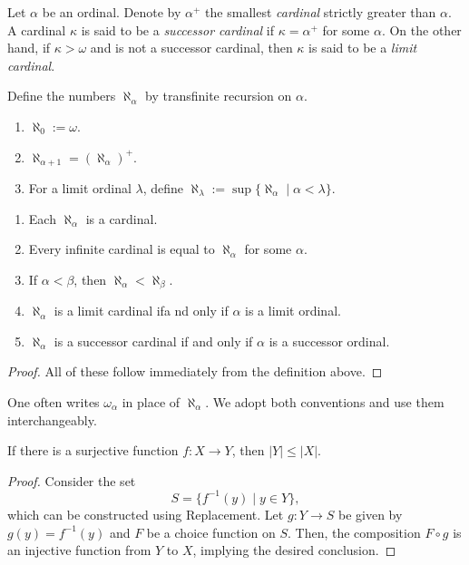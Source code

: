 \begin{definition}
    Let $\alpha$ be an ordinal. Denote by $\alpha^+$ the smallest \emph{cardinal} strictly greater than $\alpha$. A cardinal $\kappa$ is said to be a \emph{successor cardinal} if $\kappa = \alpha^+$ for some $\alpha$. On the other hand, if $\kappa > \omega$ and is not a successor cardinal, then $\kappa$ is said to be a \emph{limit cardinal}.
\end{definition}

\begin{definition}
    Define the numbers $\aleph_\alpha$ by transfinite recursion on $\alpha$.
    \begin{enumerate}[label=(\alph*)]
        \item $\aleph_0 := \omega$.
        \item $\aleph_{\alpha + 1} = (\aleph_\alpha)^+$.
        \item For a limit ordinal $\lambda$, define $\aleph_\lambda := \sup\{\aleph_\alpha\mid \alpha < \lambda\}$.
    \end{enumerate}
\end{definition}

\begin{theorem}
\begin{enumerate}[label=(\alph*)]
    \item Each $\aleph_\alpha$ is a cardinal.
    \item Every infinite cardinal is equal to $\aleph_\alpha$ for some $\alpha$.
    \item If $\alpha < \beta$, then $\aleph_\alpha < \aleph_\beta$. 
    \item $\aleph_\alpha$ is a limit cardinal ifa nd only if $\alpha$ is a limit ordinal. 
    \item $\aleph_\alpha$ is a successor cardinal if and only if $\alpha$ is a successor ordinal.
\end{enumerate}
\end{theorem}
\begin{proof}
    All of these follow immediately from the definition above.
\end{proof}

\begin{remark}
    One often writes $\omega_\alpha$ in place of $\aleph_\alpha$. We adopt both conventions and use them interchangeably.
\end{remark}

\begin{lemma}
    If there is a surjective function $f:X\to Y$, then $|Y|\le|X|$.
\end{lemma}
\begin{proof}
    Consider the set 
    \begin{equation*}
        S = \{f^{-1}(y)\mid y\in Y\},
    \end{equation*}
    which can be constructed using Replacement. Let $g: Y\to S$ be given by $g(y) = f^{-1}(y)$ and $F$ be a choice function on $S$. Then, the composition $F\circ g$ is an injective function from $Y$ to $X$, implying the desired conclusion.
\end{proof}
